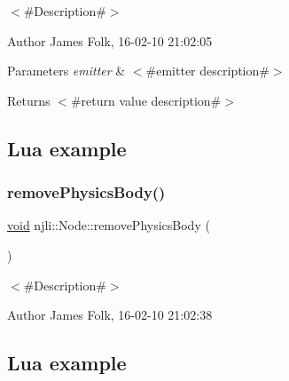 $<$\#\+Description\#$>$ 

\begin{DoxyAuthor}{Author}
James Folk, 16-\/02-\/10 21\+:02\+:05
\end{DoxyAuthor}

\begin{DoxyParams}{Parameters}
{\em emitter} & $<$\#emitter description\#$>$\\
\hline
\end{DoxyParams}
\begin{DoxyReturn}{Returns}
$<$\#return value description\#$>$
\end{DoxyReturn}
\hypertarget{classnjli_1_1_steering_behavior_wander_ex1}{}\subsection{Lua example}\label{classnjli_1_1_steering_behavior_wander_ex1}

\begin{DoxyCodeInclude}
\end{DoxyCodeInclude}
\mbox{\label{classnjli_1_1_node_ab7fb4316393dd9eaf00ac7caf65ef339}} 
\subsubsection{\texorpdfstring{remove\+Physics\+Body()}{removePhysicsBody()}}
{\footnotesize\ttfamily \mbox{\hyperlink{_thread_8h_af1e856da2e658414cb2456cb6f7ebc66}{void}} njli\+::\+Node\+::remove\+Physics\+Body (\begin{DoxyParamCaption}{ }\end{DoxyParamCaption})}



$<$\#\+Description\#$>$ 

\begin{DoxyAuthor}{Author}
James Folk, 16-\/02-\/10 21\+:02\+:38
\end{DoxyAuthor}
\hypertarget{classnjli_1_1_steering_behavior_wander_ex1}{}\subsection{Lua example}\label{classnjli_1_1_steering_behavior_wander_ex1}

\begin{DoxyCodeInclude}
\end{DoxyCodeInclude}
\mbox{\label{classnjli_1_1_node_a569a6ccc606bcc819c0f6a0be830a23d}} 
